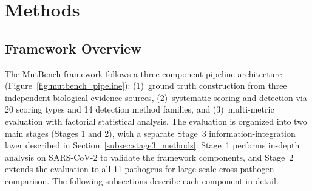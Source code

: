 \section{Methods}
\label{sec:mutbench_methods}

\subsection{Framework Overview}
\label{subsec:framework_overview}

The MutBench framework follows a three-component pipeline architecture (Figure~\ref{fig:mutbench_pipeline}): (1)~ground truth construction from three independent biological evidence sources, (2)~systematic scoring and detection via 20 scoring types and 14 detection method families, and (3)~multi-metric evaluation with factorial statistical analysis.
The evaluation is organized into two main stages (Stages 1 and 2), with a separate Stage~3 information-integration layer described in Section~\ref{subsec:stage3_methods}: Stage~1 performs in-depth analysis on SARS-CoV-2 to validate the framework components, and Stage~2 extends the evaluation to all 11 pathogens for large-scale cross-pathogen comparison.
The following subsections describe each component in detail.

